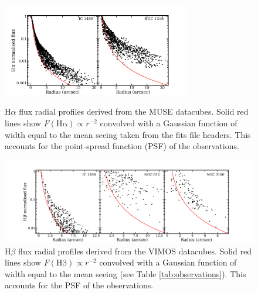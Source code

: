 		\begin{figure}
			\centering
			\includegraphics[width=0.73\textwidth]{chapter5/muse/Halpha_profile.png}
			\caption[MUSE H$\alpha$ radial profiles]{H$\alpha$ flux radial profiles derived from the MUSE datacubes. Solid red lines show $F(\mathrm{H\alpha}) \propto r^{-2}$ convolved with a Gaussian function of width equal to the mean seeing taken from the fits file headers. This accounts for the point-spread function (PSF) of the observations.\label{fig:Ha_profile_MUSE}} 

			\includegraphics[width=1.1\textwidth]{chapter5/vimos/Hbeta_profile.png}
			\caption[VIMOS H$\beta$ radial profiles]{H$\beta$ flux radial profiles derived from the VIMOS datacubes. Solid red lines show $F(\mathrm{H\beta}) \propto r^{-2}$ convolved with a Gaussian function of width equal to the mean seeing (see Table \ref{tab:observations}). This accounts for the PSF of the observations. \label{fig:Hb_profile_VIMOS}} 
		\end{figure}
		
